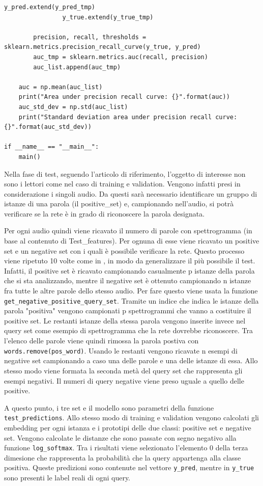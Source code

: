 \documentclass[12pt,a4paper,titlepage]{article}
\begin{document}
\begin{lstlisting}[language=iPython,firstnumber=1, caption=protonet\_test.py, label=protonet test,captionpos=b]
                y_pred.extend(y_pred_tmp)
                y_true.extend(y_true_tmp)

        precision, recall, thresholds = sklearn.metrics.precision_recall_curve(y_true, y_pred)
        auc_tmp = sklearn.metrics.auc(recall, precision)
        auc_list.append(auc_tmp)
        
    auc = np.mean(auc_list)
    print("Area under precision recall curve: {}".format(auc))
    auc_std_dev = np.std(auc_list)
    print("Standard deviation area under precision recall curve: {}".format(auc_std_dev))

if __name__ == "__main__":
    main()
\end{lstlisting}
Nella fase di test, seguendo l'articolo di riferimento, l'oggetto di interesse non sono i lettori come nel caso di training e validation. Vengono infatti presi in considerazione i singoli audio. Da questi sarà necessario identificare un gruppo di istanze di una parola (il positive\_set) e, campionando nell'audio, si potrà verificare se la rete è in grado di riconoscere la parola designata.


Per ogni audio quindi viene ricavato il numero di parole con spettrogramma (in base al contenuto di Test\_features).
Per ognuna di esse viene ricavato un positive set e un negative set con i quali è possibile verificare la rete.
Questo processo viene ripetuto 10 volte come in \cite{DBLP:journals/corr/abs-1711-06025}, in modo da generalizzare il più possibile il test.
Infatti, il positive set è  ricavato campionando casualmente p istanze della parola che si sta analizzando, mentre il negative set è ottenuto campionando n istanze fra tutte le altre parole dello stesso audio.
Per fare questo viene usata la funzione \texttt{get\_negative\_positive\_query\_set}.
Tramite un indice che indica le istanze della parola "positiva" vengono campionati p spettrogrammi che vanno a costituire il positive set. Le restanti istanze della stessa parola vengono inserite invece nel query set come esempio di spettrogramma che la rete dovrebbe riconoscere.
Tra l'elenco delle parole viene quindi rimossa la parola postiva con \texttt{words.remove(pos\_word)}.
Usando le restanti vengono ricavate n esempi di negative set campionando a caso una delle parole e una delle istanze di essa.
Allo stesso modo viene formata la seconda metà del query set che rappresenta gli esempi negativi. Il numeri di query negative viene preso uguale a quello delle positive.


A questo punto, i tre set e il modello sono parametri della funzione \texttt{test\_predictions}.
Allo stesso modo di training e validation vengono calcolati gli embedding per ogni istanza e i prototipi delle due classi: positive set e negative set.
Vengono calcolate le distanze che sono passate con segno negativo alla funzione \texttt{log\_softmax}.
Tra i risultati viene selezionato l'elemento 0 della terza dimesione che rappresenta la probabilità che la query appartenga alla classe positiva.
Queste predizioni sono contenute nel vettore \texttt{y\_pred}, mentre in \texttt{y\_true} sono presenti le label reali di ogni query.
\end{document}
